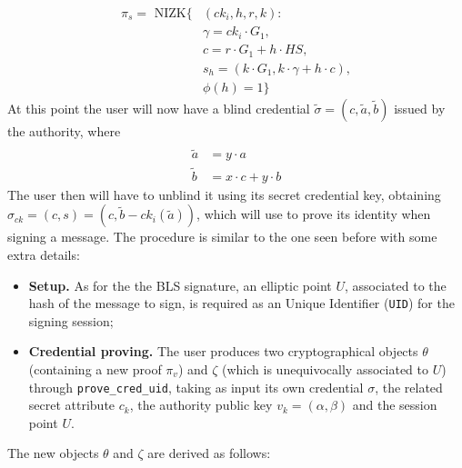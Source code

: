 \documentclass[twocolumn]{article}
\begin{document}
\begin{align*}
\pi_s = \text{ NIZK}\{&(ck_i, h, r, k): \\
&\gamma = ck_i\cdot G_1, \\
&c = r\cdot G_1 + h\cdot HS, \\
&s_h = (k \cdot G_1, k\cdot \gamma + h\cdot c), \\
&\phi(h)=1\}
\end{align*}
At this point the user will now have a blind credential $\tilde{\sigma} = (c, \tilde{a}, \tilde{b})$ issued by the authority, where
\begin{align*} \\
\tilde{a} &= y \cdot a \\
\tilde{b} &= x\cdot c + y\cdot b
\end{align*}
The user then will have to unblind it using its secret credential key, obtaining $\sigma_{ck} = (c, s) = (c, \tilde{b} - ck_i (\tilde{a}))$, which will use to prove its identity when signing a message. The procedure is similar to the one seen before with some extra details:
\begin{itemize}
    \item \textbf{Setup.} As for the the BLS signature, an elliptic point $U$, associated to the hash of the message to sign, is required as an Unique Identifier (\verb!UID!) for the signing session;
    \item \textbf{Credential proving.} The user produces two cryptographical objects $\theta$ (containing a new proof $\pi_v$) and $\zeta$ (which is unequivocally associated to $U$) through \verb!prove_cred_uid!, taking as input its own credential $\sigma$, the related secret attribute $c_k$, the authority public key $v_k = (\alpha, \beta)$ and the session point $U$.
\end{itemize}
The new objects $\theta$ and $\zeta$ are derived as follows:
\end{document}
